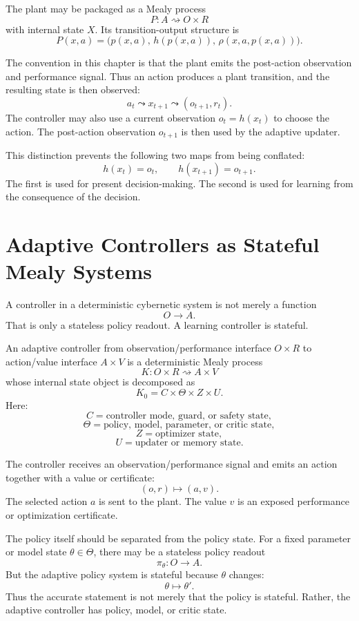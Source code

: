 The plant may be packaged as a Mealy process
\[
P:A\rightsquigarrow O\times R
\]
with internal state \(X\).  Its transition-output structure is
\[
P(x,a)=
\bigl(
p(x,a),\,h(p(x,a)),\,\rho(x,a,p(x,a))
\bigr).
\]

The convention in this chapter is that the plant emits the post-action observation and performance
signal.  Thus an action produces a plant transition, and the resulting state is then observed:
\[
a_t
\leadsto
x_{t+1}
\leadsto
(o_{t+1},r_t).
\]
The controller may also use a current observation \(o_t=h(x_t)\) to choose the action.  The
post-action observation \(o_{t+1}\) is then used by the adaptive updater.

This distinction prevents the following two maps from being conflated:
\[
h(x_t)=o_t,
\qquad
h(x_{t+1})=o_{t+1}.
\]
The first is used for present decision-making.  The second is used for learning from the consequence
of the decision.

\section{Adaptive Controllers as Stateful Mealy Systems}
\label{sec:adaptive-controllers}

A controller in a deterministic cybernetic system is not merely a function
\[
O\longrightarrow A.
\]
That is only a stateless policy readout.  A learning controller is stateful.

\begin{definition}
\label{def:adaptive-controller}
An adaptive controller from observation/performance interface \(O\times R\) to action/value
interface \(A\times V\) is a deterministic Mealy process
\[
K:O\times R\rightsquigarrow A\times V
\]
whose internal state object is decomposed as
\[
K_0=C\times \Theta\times Z\times U.
\]
Here:
\[
C=\text{controller mode, guard, or safety state},
\]
\[
\Theta=\text{policy, model, parameter, or critic state},
\]
\[
Z=\text{optimizer state},
\]
\[
U=\text{updater or memory state}.
\]
\end{definition}

The controller receives an observation/performance signal and emits an action together with a value
or certificate:
\[
(o,r)
\longmapsto
(a,v).
\]
The selected action \(a\) is sent to the plant.  The value \(v\) is an exposed performance or
optimization certificate.

The policy itself should be separated from the policy state.  For a fixed parameter or model state
\(\theta\in\Theta\), there may be a stateless policy readout
\[
\pi_\theta:O\longrightarrow A.
\]
But the adaptive policy system is stateful because \(\theta\) changes:
\[
\theta\longmapsto\theta'.
\]
Thus the accurate statement is not merely that the policy is stateful.  Rather, the adaptive
controller has policy, model, or critic state.

